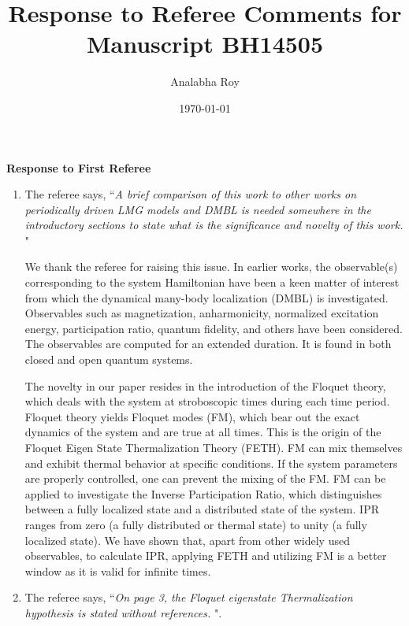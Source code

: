 \documentclass[aps,prb,reprint,showpacs,floatfix,superscriptaddress, onecolumn, nofootinbib, 9pt]{revtex4-2}
\newcommand{\response}[1]{{\color{blue}#1}} %
\begin{document}

\title{Response to Referee Comments for Manuscript BH14505}
\author{Analabha Roy}
\date{\today}

\maketitle

\vspace{1em}

\noindent \textbf{Response to First Referee}

\begin{enumerate}
\item The referee says, ``\textit{A brief comparison of this work to other works on periodically driven LMG models and DMBL is needed somewhere in the introductory sections to state what is the significance and novelty of this work. }"\\

\response{
We thank the referee for raising this issue. In earlier works, the observable(s) corresponding to the system Hamiltonian have been a keen matter of interest from which the dynamical many-body localization (DMBL) is investigated. Observables such as magnetization, anharmonicity, normalized excitation energy, participation ratio, quantum fidelity, and others have been considered. The observables are computed for an extended duration. It is found in both closed and open quantum systems.

The novelty in our paper resides in the introduction of the Floquet theory, which deals with the system at stroboscopic times during each time period. Floquet theory yields Floquet modes (FM), which bear out the exact dynamics of the system and are true at all times. This is the origin of the Floquet Eigen State Thermalization Theory (FETH). FM can mix themselves and exhibit thermal behavior at specific conditions. If the system parameters are properly controlled, one can prevent the mixing of the FM. FM can be applied to investigate the Inverse Participation Ratio, which distinguishes between a fully localized state and a distributed state of the system. IPR ranges from zero (a fully distributed or thermal state) to unity (a fully localized state). We have shown that, apart from other widely used observables, to calculate IPR, applying FETH and utilizing FM is a better window as it is valid for infinite times.
}
\item The referee says, ``\textit{On page 3, the Floquet eigenstate Thermalization hypothesis is stated without references. }".\\


\end{enumerate}
\end{document}
